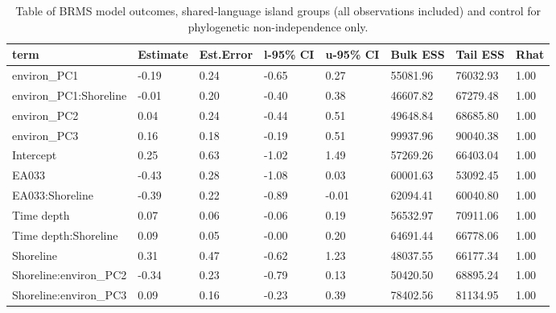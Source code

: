 \begin{table}[ht]
\centering
\begin{tabular}{p{3cm}p{1.35cm}p{1.35cm}p{1.35cm}p{1.35cm}p{1.35cm}p{1.35cm}p{1.35cm}}
  \toprule
term & Estimate & Est.Error & l-95\% CI & u-95\% CI & Bulk ESS & Tail ESS & Rhat \\ 
  \midrule
environ\_PC1 & -0.19 & 0.24 & -0.65 & 0.27 & 55081.96 & 76032.93 & 1.00 \\ 
  environ\_PC1:Shoreline & -0.01 & 0.20 & -0.40 & 0.38 & 46607.82 & 67279.48 & 1.00 \\ 
  environ\_PC2 & 0.04 & 0.24 & -0.44 & 0.51 & 49648.84 & 68685.80 & 1.00 \\ 
  environ\_PC3 & 0.16 & 0.18 & -0.19 & 0.51 & 99937.96 & 90040.38 & 1.00 \\ 
  Intercept & 0.25 & 0.63 & -1.02 & 1.49 & 57269.26 & 66403.04 & 1.00 \\ 
  EA033 & -0.43 & 0.28 & -1.08 & 0.03 & 60001.63 & 53092.45 & 1.00 \\ 
  EA033:Shoreline & -0.39 & 0.22 & -0.89 & -0.01 & 62094.41 & 60040.80 & 1.00 \\ 
  Time depth & 0.07 & 0.06 & -0.06 & 0.19 & 56532.97 & 70911.06 & 1.00 \\ 
  Time depth:Shoreline & 0.09 & 0.05 & -0.00 & 0.20 & 64691.44 & 66778.06 & 1.00 \\ 
  Shoreline & 0.31 & 0.47 & -0.62 & 1.23 & 48037.55 & 66177.34 & 1.00 \\ 
  Shoreline:environ\_PC2 & -0.34 & 0.23 & -0.79 & 0.13 & 50420.50 & 68895.24 & 1.00 \\ 
  Shoreline:environ\_PC3 & 0.09 & 0.16 & -0.23 & 0.39 & 78402.56 & 81134.95 & 1.00 \\ 
   \bottomrule
\end{tabular}
\caption{Table of BRMS model outcomes, shared-language island groups (all observations included) and control for phylogenetic non-independence only.} 
\label{BRMS_effects_medium_control_phylo}
\end{table}

